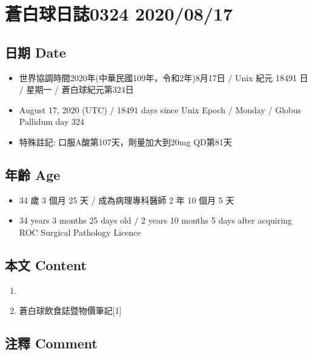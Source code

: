 \documentclass[a5paper, 11pt
]{book}
\providecommand{\tightlist}{%
  \setlength{\itemsep}{0pt}\setlength{\parskip}{0pt}}
\begin{document}
\hypertarget{ux84bcux767dux7403ux65e5ux8a8c0324-20200817}{%
\section{蒼白球日誌0324
2020/08/17}\label{ux84bcux767dux7403ux65e5ux8a8c0324-20200817}}

\hypertarget{ux65e5ux671f-date-77}{%
\subsection{日期 Date}\label{ux65e5ux671f-date-77}}

\begin{itemize}
\tightlist
\item
  世界協調時間2020年(中華民國109年，令和2年)8月17日 / Unix 紀元 18491 日
  / 星期一 / 蒼白球紀元第324日
\item
  August 17, 2020 (UTC) / 18491 days since Unix Epoch / Monday / Globus
  Pallidum day 324
\item
  特殊註記: 口服A酸第107天，劑量加大到20mg QD第81天
\end{itemize}

\hypertarget{ux5e74ux9f61-age-77}{%
\subsection{年齡 Age}\label{ux5e74ux9f61-age-77}}

\begin{itemize}
\tightlist
\item
  34 歲 3 個月 25 天 / 成為病理專科醫師 2 年 10 個月 5 天
\item
  34 years 3 months 25 days old / 2 years 10 months 5 days after
  acquiring ROC Surgical Pathology Licence
\end{itemize}

\hypertarget{ux672cux6587-content-77}{%
\subsection{本文 Content}\label{ux672cux6587-content-77}}

\begin{enumerate}
\def\labelenumi{\arabic{enumi}.}
\tightlist
\item
\item
  蒼白球飲食誌暨物價筆記{[}1{]}
\end{enumerate}

\hypertarget{ux6ce8ux91cb-comment-77}{%
\subsection{注釋 Comment}\label{ux6ce8ux91cb-comment-77}}
\end{document}
